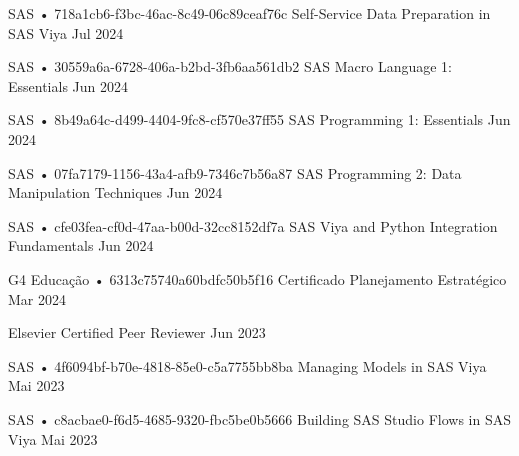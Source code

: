 \begin{cventries}
  \cventry
    {SAS • 718a1cb6-f3bc-46ac-8c49-06c89ceaf76c} %
    {Self-Service Data Preparation in SAS Viya} %
    {} %
    {Jul 2024} %
    {}

  \cventry
    {SAS • 30559a6a-6728-406a-b2bd-3fb6aa561db2} %
    {SAS Macro Language 1: Essentials} %
    {} %
    {Jun 2024} %
    {}

  \cventry
    {SAS • 8b49a64c-d499-4404-9fc8-cf570e37ff55} %
    {SAS Programming 1: Essentials} %
    {} %
    {Jun 2024} %
    {}

  \cventry
    {SAS • 07fa7179-1156-43a4-afb9-7346c7b56a87} %
    {SAS Programming 2: Data Manipulation Techniques} %
    {} %
    {Jun 2024} %
    {}

  \cventry
    {SAS • cfe03fea-cf0d-47aa-b00d-32cc8152df7a} %
    {SAS Viya and Python Integration Fundamentals} %
    {} %
    {Jun 2024} %
    {}

  \cventry
    {G4 Educação • 6313c75740a60bdfc50b5f16} %
    {Certificado Planejamento Estratégico} %
    {} %
    {Mar 2024} %
    {}

  \cventry
    {Elsevier} %
    {Certified Peer Reviewer} %
    {} %
    {Jun 2023} %
    {}

  \cventry
    {SAS • 4f6094bf-b70e-4818-85e0-c5a7755bb8ba} %
    {Managing Models in SAS Viya} %
    {} %
    {Mai 2023} %
    {}

  \cventry
    {SAS • c8acbae0-f6d5-4685-9320-fbc5be0b5666} %
    {Building SAS Studio Flows in SAS Viya} %
    {} %
    {Mai 2023} %
    {}


\end{cventries}

